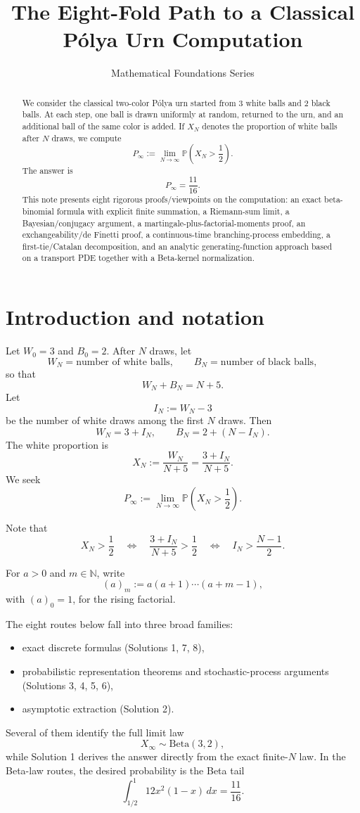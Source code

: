 \documentclass[12pt]{article}
\title{The Eight-Fold Path to a Classical P\'olya Urn Computation}
\author{Mathematical Foundations Series}
\date{}
\begin{document}
\maketitle

\begin{abstract}
We consider the classical two-color P\'olya urn started from $3$ white balls and $2$ black balls. At each step, one ball is drawn uniformly at random, returned to the urn, and an additional ball of the same color is added. If $X_N$ denotes the proportion of white balls after $N$ draws, we compute
\[
P_\infty:=\lim_{N\to\infty}\mathbb{P}\!\left(X_N>\frac12\right).
\]
The answer is
\[
P_\infty=\frac{11}{16}.
\]
This note presents eight rigorous proofs/viewpoints on the computation: an exact beta-binomial formula with explicit finite summation, a Riemann-sum limit, a Bayesian/conjugacy argument, a martingale-plus-factorial-moments proof, an exchangeability/de Finetti proof, a continuous-time branching-process embedding, a first-tie/Catalan decomposition, and an analytic generating-function approach based on a transport PDE together with a Beta-kernel normalization.
\end{abstract}

\tableofcontents

\section{Introduction and notation}

Let $W_0=3$ and $B_0=2$. After $N$ draws, let
\[
W_N=\text{number of white balls}, \qquad B_N=\text{number of black balls},
\]
so that
\[
W_N+B_N=N+5.
\]
Let
\[
I_N:=W_N-3
\]
be the number of white draws among the first $N$ draws. Then
\[
W_N=3+I_N,\qquad B_N=2+(N-I_N).
\]
The white proportion is
\[
X_N:=\frac{W_N}{N+5}=\frac{3+I_N}{N+5}.
\]
We seek
\[
P_\infty:=\lim_{N\to\infty}\mathbb{P}\!\left(X_N>\frac12\right).
\]

Note that
\[
X_N>\frac12
\quad\Longleftrightarrow\quad
\frac{3+I_N}{N+5}>\frac12
\quad\Longleftrightarrow\quad
I_N>\frac{N-1}{2}.
\]

For $a>0$ and $m\in\mathbb{N}$, write
\[
(a)_m:=a(a+1)\cdots(a+m-1),
\]
with $(a)_0=1$, for the rising factorial.

The eight routes below fall into three broad families:
\begin{itemize}
    \item exact discrete formulas (Solutions 1, 7, 8),
    \item probabilistic representation theorems and stochastic-process arguments (Solutions 3, 4, 5, 6),
    \item asymptotic extraction (Solution 2).
\end{itemize}
Several of them identify the full limit law
\[
X_\infty\sim \mathrm{Beta}(3,2),
\]
while Solution 1 derives the answer directly from the exact finite-$N$ law. In the Beta-law routes, the desired probability is the Beta tail
\[
\int_{1/2}^1 12x^2(1-x)\,dx=\frac{11}{16}.
\]
\end{document}
